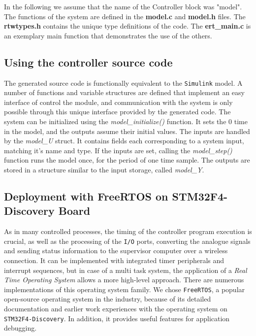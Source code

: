 In the following we assume that the name of the Controller block was "model". The functions of the system are defined in the \textbf{model.c} and \textbf{model.h} files. The \textbf{rtwtypes.h} contains the unique type definitions of the code. The \textbf{ert\_main.c} is an exemplary main function that demonstrates the use of the others.

\subsection{Using the controller source code}

The generated source code is functionally equivalent to the \verb!Simulink! model. A number of functions and variable structures are defined that implement an easy interface of control the module, and communication with the system is only possible through this unique interface provided by the generated code. The system can be initialized using the \emph{model\_initialize()} function. It sets the 0 time in the model, and the outputs assume their initial values. The inputs are handled by the \emph{model\_U} struct. It contains fields each corresponding to a system input, matching it's name and type. If the inputs are set, calling the \emph{model\_step()} function runs the model once, for the period of one time sample. The outputs are stored in a structure similar to the input storage, called \emph{model\_Y}.

\subsection{Deployment with FreeRTOS on STM32F4-Discovery Board}

As in many controlled processes, the timing of the controller program execution is crucial, as well as the processing of the \texttt{I/O} ports, converting the analogue signals and sending status information to the supervisor computer over a wireless connection. It can be implemented with integrated timer peripherals and interrupt sequences, but in case of a multi task system, the application of a \emph{Real Time Operating System} allows a more high-level approach. There are numerous implementations of this operating system family. We chose \texttt{FreeRTOS}, a popular open-source operating system in the industry, because of its detailed documentation and earlier work experiences with the operating system on \texttt{STM32F4-Discovery}. In addition, it provides useful features for application debugging.

